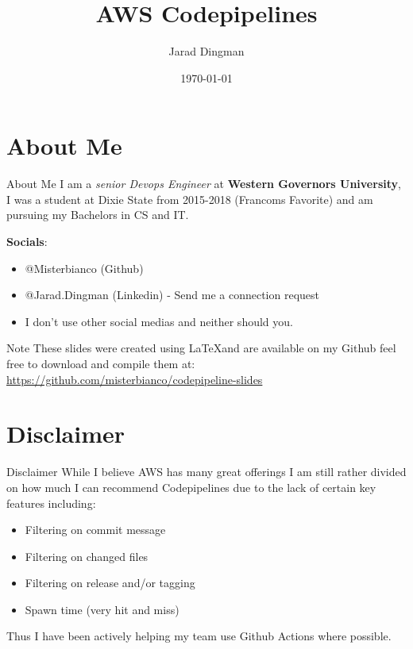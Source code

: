 \documentclass{beamer}
\title{AWS Codepipelines}
\date{\today}
\author{Jarad Dingman}
\begin{document}
  \maketitle

  \section{About Me}

    \begin{frame}{About Me}
      I am a \textit{senior Devops Engineer} at \textbf{Western Governors University}, 
      I was a student at Dixie State from 2015-2018 (Francoms Favorite) and am pursuing 
      my Bachelors in CS and IT.

      \textbf{Socials}:
      \begin{itemize}
        \item @Misterbianco (Github)
        \item @Jarad.Dingman (Linkedin) - Send me a connection request
        \item I don't use other social medias and neither should you.
      \end{itemize}
    \end{frame}

    \begin{frame}{Note}
      These slides were created using \LaTeX and are available on my Github
      feel free to download and compile them at: 
        \url{https://github.com/misterbianco/codepipeline-slides}
    \end{frame}

  \section{Disclaimer}

    \begin{frame}{Disclaimer}
      While I believe AWS has many great offerings I am still rather divided
      on how much I can recommend Codepipelines due to the lack of certain key
      features including:

      \begin{itemize}
        \item Filtering on commit message
        \item Filtering on changed files
        \item Filtering on release and/or tagging
        \item Spawn time (very hit and miss)
      \end{itemize}

      Thus I have been actively helping my team use Github Actions where possible.
    \end{frame}
\end{document}
